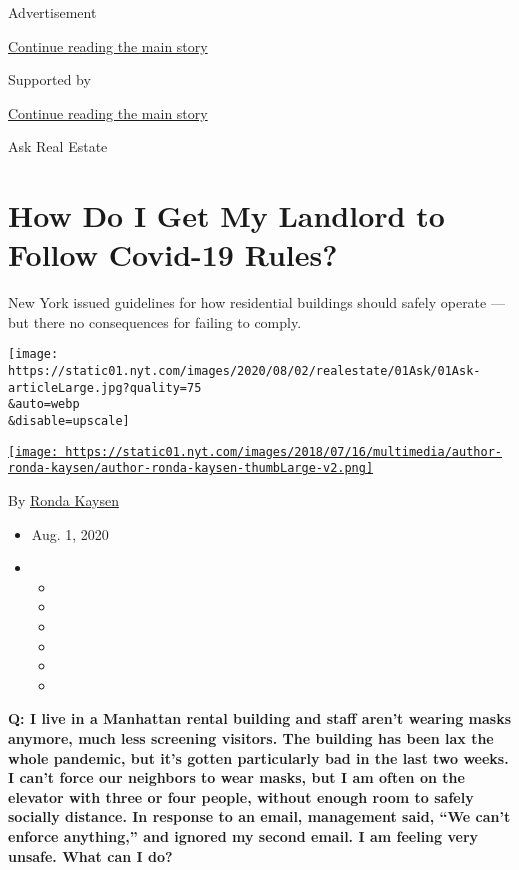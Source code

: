 Advertisement

\protect\hyperlink{after-top}{Continue reading the main story}

Supported by

\protect\hyperlink{after-sponsor}{Continue reading the main story}

Ask Real Estate

\hypertarget{how-do-i-get-my-landlord-to-follow-covid-19-rules}{%
\section{How Do I Get My Landlord to Follow Covid-19
Rules?}\label{how-do-i-get-my-landlord-to-follow-covid-19-rules}}

New York issued guidelines for how residential buildings should safely
operate --- but there no consequences for failing to comply.

\texttt{[image: https://static01.nyt.com/images/2020/08/02/realestate/01Ask/01Ask-articleLarge.jpg?quality=75\\\&auto=webp\\\&disable=upscale]}

\href{https://www.nytimes.com/by/ronda-kaysen}{\texttt{[image: https://static01.nyt.com/images/2018/07/16/multimedia/author-ronda-kaysen/author-ronda-kaysen-thumbLarge-v2.png]}}

By \href{https://www.nytimes.com/by/ronda-kaysen}{Ronda Kaysen}

\begin{itemize}
\item
  Aug. 1, 2020
\item
  \begin{itemize}
  \item
  \item
  \item
  \item
  \item
  \item
  \end{itemize}
\end{itemize}

\textbf{Q: I live in a Manhattan rental building and staff aren't
wearing masks anymore, much less screening visitors. The building has
been lax the whole pandemic, but it's gotten particularly bad in the
last two weeks. I can't force our neighbors to wear masks, but I am
often on the elevator with three or four people, without enough room to
safely socially distance. In response to an email, management said, ``We
can't enforce anything,'' and ignored my second email. I am feeling very
unsafe. What can I do?}

